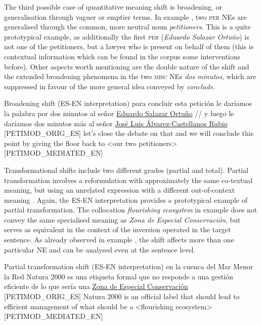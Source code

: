 \documentclass[output=paper]{langscibook}
\begin{document}
The third possible case of quantitative meaning shift is broadening, or generalisation through vaguer or emptier terms. In example , two \textsc{per}  NEs are generalised through the common, more neutral noun \textit{petitioners}. This is a quite prototypical example, as additionally the first \textsc{per} (\textit{Eduardo Salazar Ortuño}) is not one of the petitioners, but a lawyer who is present on behalf of them (this is contextual information which can be found in the corpus some interventions before). Other aspects worth mentioning are the double nature of the shift and the extended broadening phenomena in the two \textsc{misc} NEs \textit{dos minutos}, which are suppressed in favour of the more general idea conveyed by \textit{conclude}.

\ea\label{ex:corpas:6}
Broadening shift (ES-EN interpretation)
\ea
para concluir esta petición le daríamos la palabra por dos minutos al señor \underline{Eduardo Salazar Ortuño} // y luego le daríamos dos minutos más al señor \underline{José Luis Álvarez-Castellanos Rubio} [PETIMOD\_ORIG\_ES]
\ex
let's close the debate on that and we will conclude this point by giving the floor back to <our two petitioners> [PETIMOD\_MEDIATED\_EN]
\z
\z

Transformational shifts include two different grades (partial and total). Partial transformation involves a reformulation with approximately the same co-textual meaning, but using an unrelated expression with a different out-of-context meaning \citep[142]{Bernardini2016}. Again, the ES-EN interpretation provides a prototypical example of partial transformation. The collocation \textit{flourishing ecosystem} in example  does not convey the same specialised meaning as \textit{Zona de Especial Conservación}, but serves as equivalent in the context of the inversion operated in the target sentence. As already observed in example , the shift affects more than one particular NE and can be analysed even at the sentence level.

\ea\label{ex:corpas:7}
Partial transformation shift (ES-EN interpretation)
\ea
en la cuenca del Mar Menor la Red Natura 2000 es una etiqueta formal que no responde a una gestión eficiente de lo que sería una \underline{Zona de Especial Conservación} [PETIMOD\_ORIG\_ES]
\ex
Natura 2000 is an official label that should lead to efficient management of what should be a <flourishing ecosystem> [PETIMOD\_MEDIATED\_EN]
\z
\z
\end{document}
